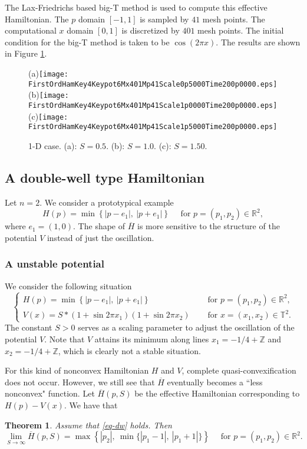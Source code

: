 \documentclass[12pt,reqno]{amsart}
\theoremstyle{plain}
\newtheorem{thm}{Theorem}[section]
\theoremstyle{remark}
\numberwithin{equation}{section}
\newcommand{\R}{\mathbb{R}}
\newcommand{\T}{\mathbb{T}}
\newcommand{\Z}{\mathbb{Z}}
\newcommand{\ol}{\overline}
\begin{document}
The Lax-Friedrichs based big-T method  is used to compute this effective Hamiltonian. 
The $p$ domain $[-1,1]$ is sampled by $41$ mesh points. 
 The computational $x$ domain $[0,1]$ is discretized by $401$ mesh points.
The initial condition for the big-T method is taken to be $\cos(2\pi x)$. 
The results are shown in Figure \ref{qtyEx3_2}.

\begin{figure}[htb]
 \centering
  (a){\texttt{[image: FirstOrdHamKey4Keypot6Mx401Mp41Scale0p5000Time200p0000.eps]}}
  (b){\texttt{[image: FirstOrdHamKey4Keypot6Mx401Mp41Scale1p0000Time200p0000.eps]}}
  (c){\texttt{[image: FirstOrdHamKey4Keypot6Mx401Mp41Scale1p5000Time200p0000.eps]}} 
  \caption{1-D case. (a): $S=0.5$. (b): $S=1.0$. (c): $S=1.50$.} 
\label{qtyEx3_2}
\end{figure}




\subsection{A double-well type Hamiltonian} \label{sec:num}  Let $n=2$. We consider a prototypical example
$$
H(p)=\min \left\{|p-e_1|, \  |p+e_1|\right\} \quad \text{ for } p=(p_1,p_2)\in \R^2,
$$
where $e_1=(1,0)$. The shape of $\ol H$ is more sensitive to the structure of the potential $V$ instead of just the oscillation. 

\subsubsection{A unstable potential} We consider the following situation
\begin{equation}\label{eq-dw}
\begin{cases}
H(p)=\min \left\{|p-e_1|, \  |p+e_1|\right\} \quad &\text{ for } p=(p_1,p_2)\in \R^2,\\
V(x)=S *(1+\sin 2\pi x_1)(1+\sin 2\pi x_2) \quad &\text{ for } x=(x_1,x_2) \in \T^2.
\end{cases}
\end{equation}
The constant $S>0$ serves as a scaling parameter to adjust the  oscillation of the potential $V$.  
Note that $V$ attains its minimum along lines $x_1=-1/4+\Z$ and $x_2=-1/4+\Z$, which is clearly not a stable situation.


For this  kind  of nonconvex Hamiltonian $H$ and $V$, complete quasi-convexification does not occur.  
However, we still see  that  $\overline H$ eventually becomes a  ``less nonconvex" function. 
Let $\overline H(p,S)$ be the effective Hamiltonian corresponding to $H(p)-V(x)$.   We have that 
\begin{thm}\label{thm:limit}
Assume that \eqref{eq-dw} holds. Then
\[
\lim_{S\to \infty}\overline H(p,S)=\max\left\{|p_2|, \  \min \{|p_1-1|, \  |p_1+1|\}\right\} \quad \text{ for } p=(p_1,p_2)\in \R^2.
\]
\end{thm}
\end{document}
